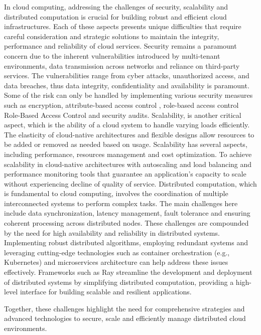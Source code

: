 In cloud computing, addressing the challenges of security, scalability and distributed computation is crucial for building robust and efficient cloud infrastructures. Each of these aspects presents unique difficulties that require careful consideration and strategic solutions to maintain the integrity, performance and reliability of cloud services. Security remains a paramount concern due to the inherent vulnerabilities introduced by multi-tenant environments, data transmission across networks and reliance on third-party services. The vulnerabilities range from cyber attacks, unauthorized access, and data breaches, thus data integrity, confidentiality and availability is paramount. Some of the risk can only be handled by implementing various security measures such as encryption, attribute-based access control , role-based access control  {Role-Based Access Control} and security audits. Scalability, is another critical aspect, which is the ability of a cloud system to handle varying loads efficiently. The elasticity of cloud-native architectures and flexible designs allow resources to be added or removed as needed based on usage. Scalability has several aspects, including performance, resources management and cost optimization. To achieve scalability in cloud-native architectures with autoscaling and load balancing and performance monitoring tools that guarantee an application’s capacity to scale without experiencing decline of quality of service. Distributed computation, which is fundamental to cloud computing, involves the coordination of multiple interconnected systems to perform complex tasks. The main challenges here include data synchronization, latency management, fault tolerance and ensuring coherent processing across distributed nodes. These challenges are compounded by the need for high availability and reliability in distributed systems. Implementing robust distributed algorithms, employing redundant systems and leveraging cutting-edge technologies such as container orchestration (e.g., Kubernetes) and microservices architecture can help address these issues effectively. Frameworks such as Ray streamline the development and deployment of distributed systems by simplifying distributed computation, providing a high-level interface for building scalable and resilient applications. \cite{r5}

Together, these challenges highlight the need for comprehensive strategies and advanced technologies to secure, scale and efficiently manage distributed cloud environments.


